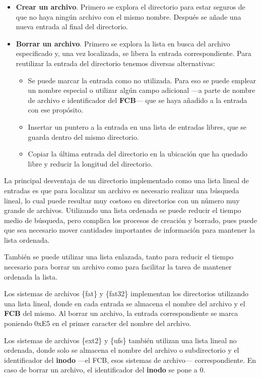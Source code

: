 \begin{itemize}
\item
  \textbf{Crear un archivo}. Primero se explora el directorio para estar
  seguros de que no haya ningún archivo con el mismo nombre. Después se
  añade una nueva entrada al final del directorio.
\item
  \textbf{Borrar un archivo}. Primero se explora la lista en busca del
  archivo especificado y, una vez localizada, se libera la entrada
  correspondiente. Para reutilizar la entrada del directorio tenemos
  diversas alternativas:

  \begin{itemize}
  \item
    Se puede marcar la entrada como no utilizada. Para eso se puede
    emplear un nombre especial o utilizar algún campo adicional ---a
    parte de nombre de archivo e identificador del \textbf{FCB}--- que
    se haya añadido a la entrada con ese propósito.
  \item
    Insertar un puntero a la entrada en una lista de entradas libres,
    que se guarda dentro del mismo directorio.
  \item
    Copiar la última entrada del directorio en la ubicación que ha
    quedado libre y reducir la longitud del directorio.
  \end{itemize}
\end{itemize}

La principal desventaja de un directorio implementado como una lista
lineal de entradas es que para localizar un archivo es necesario
realizar una búsqueda lineal, lo cual puede resultar muy costoso en
directorios con un número muy grande de archivos. Utilizando una lista
ordenada se puede reducir el tiempo medio de búsqueda, pero complica los
procesos de creación y borrado, pues puede que sea necesario mover
cantidades importantes de información para mantener la lista ordenada.

También se puede utilizar una lista enlazada, tanto para reducir el
tiempo necesario para borrar un archivo como para facilitar la tarea de
mantener ordenada la lista.

Los sistemas de archivos \{fat\} y \{fat32\} implementan los directorios
utilizando una lista lineal, donde en cada entrada se almacena el nombre
del archivo y el \textbf{FCB} del mismo. Al borrar un archivo, la
entrada correspondiente se marca poniendo 0xE5 en el primer caracter del
nombre del archivo.

Los sistemas de archivos \{ext2\} y \{ufs\} también utilizan una lista
lineal no ordenada, donde solo se almacena el nombre del archivo o
subdirectorio y el identificador del \textbf{inodo} ---el FCB, esos
sistemas de archivo--- correspondiente. En caso de borrar un archivo, el
identificador del \textbf{inodo} se pone a 0.

